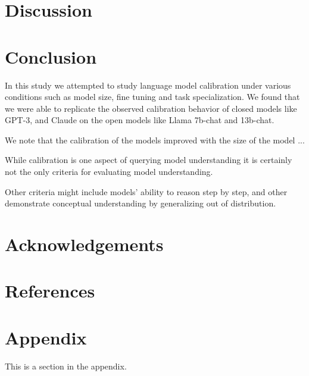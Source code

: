 \documentclass[11pt]{article}
\begin{document}
\section{Discussion}

\section{Conclusion}

In this study we attempted to study language model calibration 
under various conditions such as model size, fine tuning and  
task specialization. We found that we were able to replicate the 
observed  calibration behavior of closed models like GPT-3, and 
Claude on the open models like Llama 7b-chat and 13b-chat. 

We note that the calibration of the models  improved with the size 
of the model ...

While calibration is one aspect of querying model understanding it is 
certainly  not the only criteria for evaluating model understanding.  

Other criteria might include models' ability to reason step by step, 
and other demonstrate conceptual understanding by generalizing 
out of distribution. 

\section{Acknowledgements}

\section{References}




\appendix

\section{Appendix}
\label{sec:appendix}

This is a section in the appendix.
\end{document}
